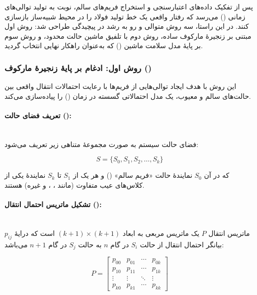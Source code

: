 \documentclass[a4paper, 10pt, twocolumn]{article}
\begin{document}
	پس از تفکیک داده‌های اعتبارسنجی و استخراج فریم‌های سالم، نوبت به تولید توالی‌های زمانی () می‌رسد که رفتار واقعی یک خط تولید فولاد را در محیط شبیه‌ساز  بازسازی کنند. در این راستا، سه روش متوالی و رو به رشد در پیچیدگی طراحی شد: روش اول مبتنی بر زنجیرهٔ مارکوف ساده، روش دوم با تلفیق ماشین حالت محدود، و روش سوم بر پایهٔ مدل سلامت ماشین () که به‌عنوان راهکار نهایی انتخاب گردید.
	
	\subsubsection*{روش اول: ادغام بر پایهٔ زنجیرهٔ مارکوف ()}
	
	این روش با هدف ایجاد توالی‌هایی از فریم‌ها با رعایت احتمالات انتقال واقعی بین حالت‌های سالم و معیوب، یک مدل احتمالاتی گسسته در زمان () را پیاده‌سازی می‌کند.
	
	\paragraph{تعریف فضای حالت (): }\mbox{} \\
	
	فضای حالت سیستم به صورت مجموعهٔ متناهی زیر تعریف می‌شود:
	
	$$S = \{S_0, S_1, S_2, \ldots, S_k\}$$
	
	که در آن $S_0$ نمایندهٔ حالت «فریم سالم» () و هر یک از $S_1$ تا $S_k$ نمایندهٔ یکی از کلاس‌های عیب متفاوت (مانند ، ،  و غیره) هستند.
	
	\paragraph{تشکیل ماتریس احتمال انتقال (): } \mbox{} \\
	
	ماتریس انتقال $P$ یک ماتریس مربعی به ابعاد $(k+1) \times (k+1)$ است که درایهٔ $p_{ij}$ بیانگر احتمال انتقال از حالت $S_i$ در گام $n$ به حالت $S_j$ در گام $n+1$ می‌باشد:
	
	$$P = \begin{bmatrix} p_{00} & p_{01} & \cdots & p_{0k} \\ p_{10} & p_{11} & \cdots & p_{1k} \\ \vdots & \vdots & \ddots & \vdots \\ p_{k0} & p_{k1} & \cdots & p_{kk} \end{bmatrix} $$
	
\end{document}
